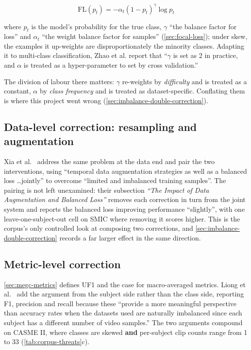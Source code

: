 \[
	\text{FL}(p_t) = -\alpha_t (1 - p_t)^{\gamma}\log p_t
\]

where $p_t$ is the model's probability for the true class, $\gamma$ ``the balance factor for loss'' and $\alpha_t$ ``the weight balance factor for samples'' (\autoref{sec:focal-loss}); under skew, the examples it up-weights are disproportionately the minority classes. Adapting it to multi-class classification, Zhao et al. report that ``$\gamma$ is set as 2 in practice, and $\alpha$ is treated as a hyper-parameter to set by cross validation.''

The division of labour there matters: $\gamma$ re-weights by \textit{difficulty} and is treated as a constant, $\alpha$ by \textit{class frequency} and is treated as dataset-specific. Conflating them is where this project went wrong (\autoref{sec:imbalance-double-correction}).

\subsection{Data-level correction: resampling and augmentation}
\label{sec:imbalance-balanced-loss}

Xia et al.~\cite{xia2020a} address the same problem at the data end and pair the two interventions, using ``temporal data augmentation strategies as well as a balanced loss \ldots jointly'' to overcome ``limited and imbalanced training samples''. The pairing is not left unexamined: their subsection \textit{``The Impact of Data Augmentation and Balanced Loss''} removes each correction in turn from the joint system and reports the balanced loss improving performance ``slightly'', with one leave-one-subject-out cell on SMIC where removing it scores higher. This is the corpus's only controlled look at composing two corrections, and \autoref{sec:imbalance-double-correction} records a far larger effect in the same direction.

\subsection{Metric-level correction}
\label{sec:imbalance-metrics}

\autoref{sec:megc-metrics} defines UF1 and the case for macro-averaged metrics. Liong et al.~\cite{liong2016} add the argument from the subject side rather than the class side, reporting F1, precision and recall because these ``provide a more meaningful perspective than accuracy rates when the datasets used are naturally imbalanced since each subject has a different number of video samples.'' The two arguments compound on CASME II, where classes are skewed \textbf{and} per-subject clip counts range from 1 to 33 (\autoref{tab:corpus-threats}c).


